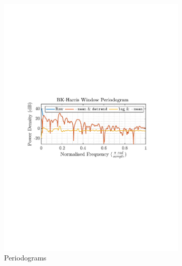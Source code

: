 \documentclass[12pt]{article}
\numberwithin{equation}{section}
\begin{document}
\begin{figure}[H]
\begin{subfigure}{0.49\textwidth}
			\includegraphics[trim={2.2cm 11.2cm 3.15cm  11.2cm}, clip, width=\textwidth]{../MATLAB/figures/q1_2a_fig02.pdf} 
			\captionsetup{justification=centering}
			\caption{Periodograms}
		\end{subfigure}
		\captionsetup{justification=centering}
		\caption{}
		\label{fig: 1-2a}
	\end{figure}
\end{document}
